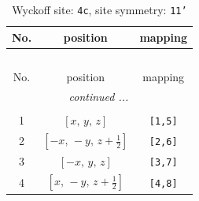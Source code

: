 \documentclass[fleqn,8pt]{jsarticle}
\begin{document}
\renewcommand{\arraystretch}{1.2}
\begin{longtable}{ccc}
\caption{Wyckoff site: {\tt 4c}, site symmetry: {\tt 11'}}
 \\
 \hline \hline
No. & position & mapping \\ \hline \endfirsthead

\multicolumn{2}{l}{\tablename\ \thetable{}} \\
 \hline \hline
No. & position & mapping \\ \hline \endhead

 \hline \hline
\multicolumn{2}{r}{\footnotesize\it continued ...} \\ \endfoot

 \hline \hline
\multicolumn{2}{r}{} \\ \endlastfoot

1 & $\left[ x,\, y,\, z \right]$ & {\tt [1,5]} \\ \hline
2 & $\left[ - x,\, - y,\, z + \frac{1}{2} \right]$ & {\tt [2,6]} \\ \hline
3 & $\left[ - x,\, y,\, z \right]$ & {\tt [3,7]} \\ \hline
4 & $\left[ x,\, - y,\, z + \frac{1}{2} \right]$ & {\tt [4,8]} \\
\end{longtable}
\end{document}
